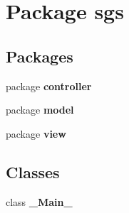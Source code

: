 \section{Package sgs}
\label{namespacesgs}
\subsection*{Packages}
\begin{DoxyCompactItemize}
\item 
package {\bf controller}
\item 
package {\bf model}
\item 
package {\bf view}
\end{DoxyCompactItemize}
\subsection*{Classes}
\begin{DoxyCompactItemize}
\item 
class {\bf \-\_\-\-Main\-\_\-}
\end{DoxyCompactItemize}
